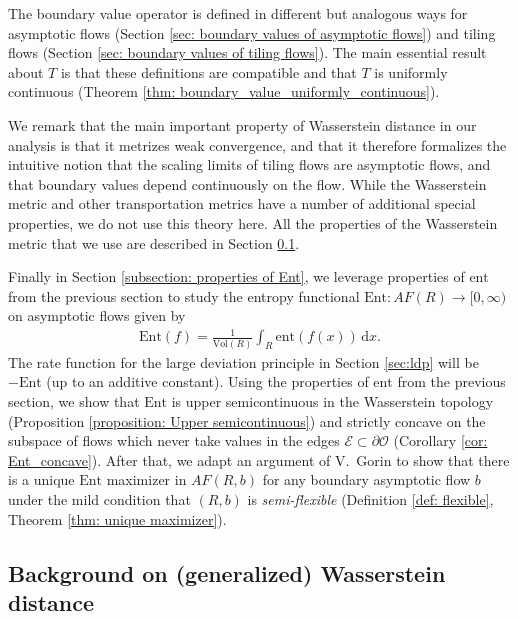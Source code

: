 \documentclass[11pt]{article}
\theoremstyle{remark}
\theoremstyle{definition}
\newcommand{\ent}{\text{ent}}
\newcommand{\Ent}{\text{Ent}}
\newcommand{\mc}[1]{\mathcal{#1}}
\newcommand{\Vol}{\text{Vol}}
\newcommand{\dd}{\mathrm{d}}
\begin{document}
The boundary value operator is defined in different but analogous ways for asymptotic flows (Section \ref{sec: boundary values of asymptotic flows}) and tiling flows (Section \ref{sec: boundary values of tiling flows}). The main essential result about $T$ is that these definitions are compatible and that $T$ is uniformly continuous (Theorem \ref{thm: boundary_value_uniformly_continuous}). 

We remark that the main important property of Wasserstein distance in our analysis is that it metrizes weak convergence, and that it therefore formalizes the intuitive notion that the scaling limits of tiling flows are asymptotic flows, and that boundary values depend continuously on the flow. While the Wasserstein metric and other transportation metrics have a number of additional special properties, we do not use this theory here. All the properties of the Wasserstein metric that we use are described in Section \ref{sec:wass_background}.

Finally in Section \ref{subsection: properties of Ent}, we leverage properties of $\ent$ from the previous section to study the entropy functional $\Ent: AF(R) \to [0,\infty)$ on asymptotic flows given by 
\begin{align*}
    \Ent(f) = \frac{1}{\Vol(R)} \int_{R} \ent(f(x)) \, \dd x.
\end{align*}
The rate function for the large deviation principle in Section \ref{sec:ldp} will be $-\Ent$ (up to an additive constant). Using the properties of $\ent$ from the previous section, we show that $\Ent$ is upper semicontinuous in the Wasserstein topology (Proposition \ref{proposition: Upper semicontinuous}) and strictly concave on the subspace of flows which never take values in the edges $\mc E\subset \partial \mc O$ (Corollary \ref{cor: Ent_concave}). After that, we adapt an argument of V.~Gorin \cite{gorin2021lectures} to show that there is a unique $\Ent$ maximizer in $AF(R,b)$ for any boundary asymptotic flow $b$ under the mild condition that $(R,b)$ is \textit{semi-flexible} (Definition \ref{def: flexible}, Theorem \ref{thm: unique maximizer}). 


\subsection{Background on (generalized) Wasserstein distance}\label{sec:wass_background}
\end{document}
